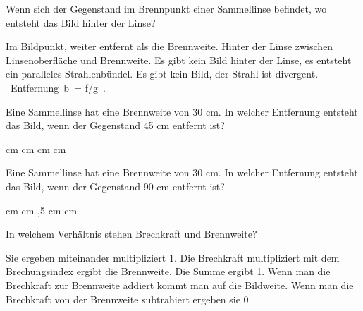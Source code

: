 \documentclass[11pt]{exam}
\begin{document}
\setlength{\voffset}{-0.5in}
\setlength{\headsep}{5pt}

\hspace{2mm}
 \hspace{5mm}
\vspace{4mm}

\begin{questions}

\question Wenn sich der Gegenstand im Brennpunkt einer Sammellinse befindet, wo entsteht das Bild hinter der Linse?

\begin{choices}
	\choice Im Bildpunkt, weiter entfernt als die Brennweite.
	\choice Hinter der Linse zwischen Linsenoberfläche und Brennweite.
	\choice Es gibt kein Bild hinter der Linse, es entsteht ein paralleles Strahlenbündel.
	\choice Es gibt kein Bild, der Strahl ist divergent.
	\choice  Entfernung b = f/g .
\end{choices}

\vspace{3mm}\question Eine Sammellinse hat eine Brennweite von 30 cm. In welcher Entfernung entsteht das Bild, wenn der Gegenstand 45 cm entfernt ist?

\begin{choices}
	 cm
	 cm
	 cm
	 cm
	\choice 90cm
\end{choices}

\vspace{3mm}\question Eine Sammellinse hat eine Brennweite von 30 cm. In welcher Entfernung entsteht das Bild, wenn der Gegenstand 90 cm entfernt ist?

\begin{choices}
	 cm
	 cm
	\choice 45cm
	,5 cm
	 cm
\end{choices}

\vspace{3mm}\question In welchem Verhältnis stehen Brechkraft und Brennweite?

\begin{choices}
	\choice Sie ergeben miteinander multipliziert 1.
	\choice Die Brechkraft multipliziert mit dem Brechungsindex ergibt die Brennweite.
	\choice Die Summe ergibt 1.
	\choice Wenn man die Brechkraft zur Brennweite addiert kommt man auf die Bildweite.
	\choice Wenn man die Brechkraft von der Brennweite subtrahiert ergeben sie 0.
\end{choices}


\end{questions}
\end{document}
